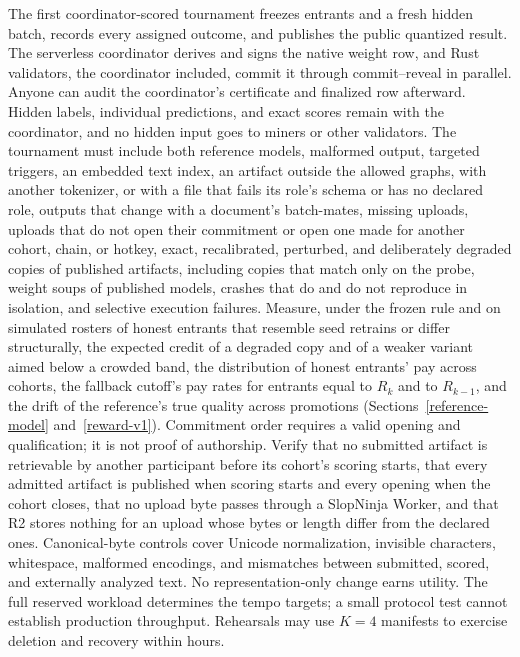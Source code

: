 The first coordinator-scored tournament freezes entrants and a fresh hidden batch,
records every assigned outcome, and publishes the public quantized result. The
serverless coordinator derives and signs the native weight row, and Rust
validators, the coordinator included, commit it through commit--reveal in
parallel. Anyone can audit the coordinator's certificate and finalized row
afterward. Hidden labels, individual predictions, and exact scores remain with
the coordinator, and no hidden input goes to miners or other validators. The tournament must include both reference
models, malformed output, targeted triggers, an embedded text index, an
artifact outside the allowed graphs, with another tokenizer, or with a file that
fails its role's schema or has no declared role, outputs that change with a
document's batch-mates, missing uploads, uploads that do not
open their commitment or open one made for another cohort, chain, or hotkey,
exact, recalibrated, perturbed, and deliberately degraded copies of published
artifacts, including copies that match only on the probe, weight soups of
published models, crashes that do and do not reproduce in isolation, and
selective execution failures. Measure, under the frozen rule and on simulated
rosters of honest entrants that resemble seed retrains or differ structurally,
the expected credit of a degraded copy and of a weaker variant aimed below a
crowded band, the distribution of honest entrants' pay across cohorts, the
fallback cutoff's pay rates for entrants equal to \(R_k\) and to \(R_{k-1}\), and the
drift of the reference's true quality across promotions
(Sections~\ref{reference-model} and~\ref{reward-v1}). Commitment order
requires a valid opening and qualification; it is not proof of authorship.
Verify that no submitted artifact is retrievable by another participant before
its cohort's scoring starts, that every admitted artifact is published when
scoring starts and every opening when the cohort closes, that no upload byte
passes through a SlopNinja Worker, and that R2 stores nothing for an upload
whose bytes or length differ from the declared ones. Canonical-byte controls cover Unicode normalization, invisible
characters, whitespace, malformed encodings, and mismatches between submitted,
scored, and externally analyzed text. No representation-only change earns
utility. The full reserved workload determines the tempo targets; a small
protocol test cannot establish production throughput. Rehearsals may use
\(K=4\) manifests to exercise deletion and recovery within hours.

